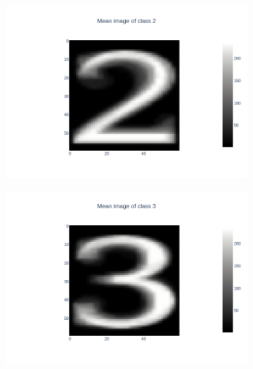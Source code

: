 \documentclass{article}
\begin{document}
\begin{figure}[h]
\begin{subfigure}{.3\linewidth}
    \end{subfigure}
    \hfill
    \begin{subfigure}{.3\linewidth}
        \centering
        \includegraphics[width=\linewidth]{images/q2/partd/2_prototype.png}
    \end{subfigure}
    \newline
    \begin{subfigure}{.3\linewidth}
        \centering
        \includegraphics[width=\linewidth]{images/q2/partd/3_prototype.png}
    \end{subfigure}
    \hfill
    \begin{subfigure}{.3\linewidth}
        \centering

\end{subfigure}
\end{figure}
\end{document}
